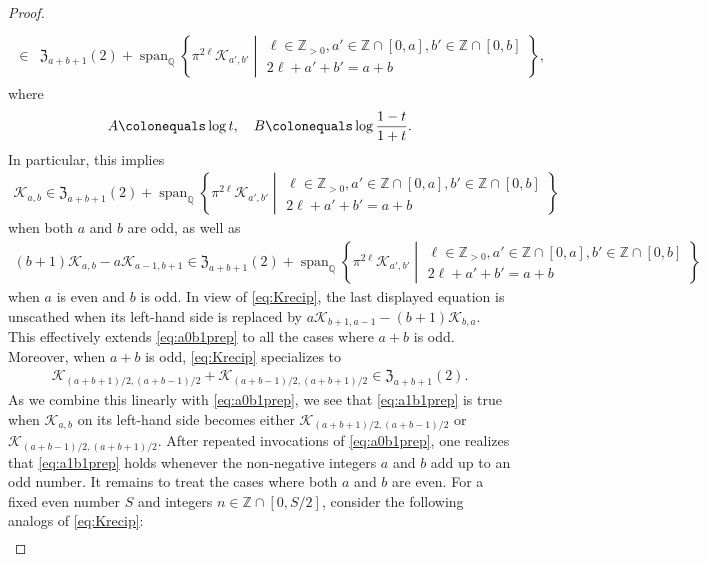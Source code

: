 \documentclass[final,notitlepage,12pt,reqno]{amsart}
\DeclareMathOperator{\Span}{span}
\theoremstyle{plain}
\theoremstyle{definition}
\numberwithin{equation}{section}
\begin{document}
\begin{proof}
\begin{align}
\begin{split}
\\\in{}&\mathfrak Z_{a+b+1}(2)+\Span_{\mathbb Q}\left\{\pi^{2\ell}\mathscr K_{a',b'}\middle|\begin{smallmatrix}\ell\in\mathbb Z_{>0},a'\in\mathbb Z\cap[0,a],b'\in\mathbb Z\cap[0,b]\\2\ell+a'+b'=a+b\end{smallmatrix}\right\},
\end{split}
\end{align}where \begin{align}
A\colonequals\log t,\quad B\colonequals\log\frac{1-t}{1+t} .
\end{align}In particular, this implies \begin{align}
\mathscr K_{a,b}\in \mathfrak Z_{a+b+1}(2)+\Span_{\mathbb Q}\left\{\pi^{2\ell}\mathscr K_{a',b'}\middle|\begin{smallmatrix}\ell\in\mathbb Z_{>0},a'\in\mathbb Z\cap[0,a],b'\in\mathbb Z\cap[0,b]\\2\ell+a'+b'=a+b\end{smallmatrix}\right\}\label{eq:a1b1prep}
\end{align} when both  $ a$ and  $b$ are odd, as well as \begin{align}
(b+1)\mathscr K_{a,b}-a\mathscr K_{a-1,b+1}\in \mathfrak Z_{a+b+1}(2)+\Span_{\mathbb Q}\left\{\pi^{2\ell}\mathscr K_{a',b'}\middle|\begin{smallmatrix}\ell\in\mathbb Z_{>0},a'\in\mathbb Z\cap[0,a],b'\in\mathbb Z\cap[0,b]\\2\ell+a'+b'=a+b\end{smallmatrix}\right\}\label{eq:a0b1prep}
\end{align}when $a$ is even and $b$ is odd. In view of \eqref{eq:Krecip}, the last displayed equation is unscathed when its left-hand side is replaced by  $ a\mathscr K_{b+1,a-1}-(b+1)\mathscr K_{b,a}$. This effectively extends  \eqref{eq:a0b1prep} to all the cases where $ a+b$ is odd. Moreover, when  $ a+b$ is odd,  \eqref{eq:Krecip} specializes to \begin{align}
\mathscr K_{(a+b+1)/2,(a+b-1)/2}+\mathscr K_{(a+b-1)/2,(a+b+1)/2}\in\mathfrak Z_{a+b+1}(2).
\end{align}    As we combine this linearly with   \eqref{eq:a0b1prep}, we see that  \eqref{eq:a1b1prep}  is true when $ \mathscr K_{a,b}$ on its left-hand side becomes either   $ \mathscr K_{(a+b+1)/2,(a+b-1)/2}$ or $ \mathscr K_{(a+b-1)/2,(a+b+1)/2}$. After repeated invocations of  \eqref{eq:a0b1prep}, one realizes that   \eqref{eq:a1b1prep}  holds whenever the non-negative integers $ a$ and $b$ add up to an odd number.  It remains to treat the cases where both  $ a$ and  $b$ are  even. For  a fixed even number $S$ and integers $ n\in\mathbb Z\cap[0,S/2]$, consider the following analogs of  \eqref{eq:Krecip}:\begin{align}

\end{align}
\end{proof}
\end{document}
